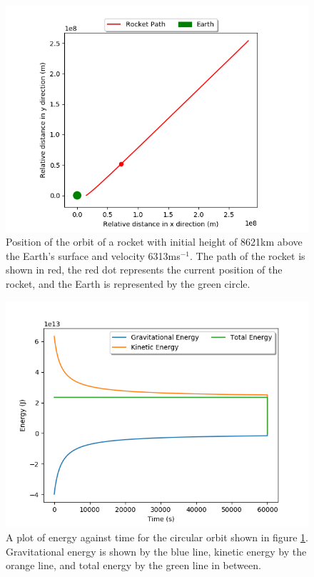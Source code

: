\documentclass[twocolumn,prl,nobalancelastpage,aps,10pt]{revtex4-1}
\begin{document}
\begin{figure}[ht]
	\includegraphics*[width=0.96\linewidth,clip]{circularTooHigh}
	\caption{Position of the orbit of a rocket with initial height of 8621km above the Earth's surface and velocity 6313ms$^{-1}$. The path of the rocket is shown in red, the red dot represents the current position of the rocket, and the Earth is represented by the green circle.} \label{circHighFig}
\end{figure}

\begin{figure}[ht]
	\includegraphics*[width=0.96\linewidth,clip]{circularTooHighEnergy}
	\caption{A plot of energy against time for the circular orbit shown in figure \ref{circHighFig}. Gravitational energy is shown by the blue line, kinetic energy by the orange line, and total energy by the green line in between.} \label{circHighEn}
\end{figure}
\end{document}
